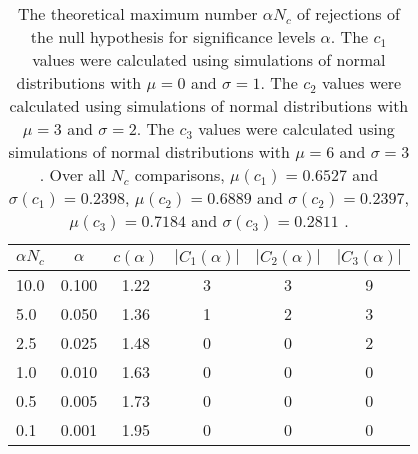 \begin{table}[h!]
\begin{center}
\begin{tabular}{| l | c | c | c | c | c |}\hline
$\alpha N_c$ & $\alpha$ & $c(\alpha)$ & $|C_1(\alpha)|$ & $|C_2(\alpha)|$ & $|C_3(\alpha)|$ \\\hline
10.0 & 0.100 & 1.22 & 3 & 3 & 9 \\\hline
5.0 & 0.050 & 1.36 & 1 & 2 & 3 \\\hline
2.5 & 0.025 & 1.48 & 0 & 0 & 2 \\\hline
1.0 & 0.010 & 1.63 & 0 & 0 & 0 \\\hline
0.5 & 0.005 & 1.73 & 0 & 0 & 0 \\\hline
0.1 & 0.001 & 1.95 & 0 & 0 & 0 \\\hline
\end{tabular}
\caption{The theoretical maximum number $\alpha N_c$ of rejections
of the null hypothesis for significance levels $\alpha$.
The $c_1$ values were calculated using simulations of normal distributions with $\mu=0$ and $\sigma=1$.
The $c_2$ values were calculated using simulations of normal distributions with $\mu=3$ and $\sigma=2$.
The $c_3$ values were calculated using simulations of normal distributions with $\mu=6$ and $\sigma=3$.
Over all $N_c$ comparisons,
 $\mu(c_1)=0.6527$ and $\sigma(c_1)=0.2398$,
 $\mu(c_2)=0.6889$ and $\sigma(c_2)=0.2397$,
 $\mu(c_3)=0.7184$ and $\sigma(c_3)=0.2811$ .
}
\end{center}
\end{table}
